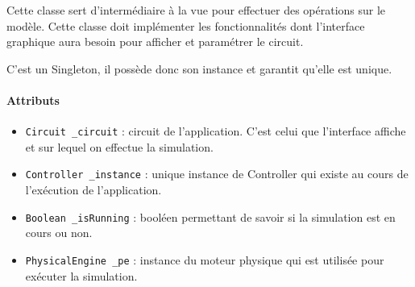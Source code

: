 \documentclass{report}
\begin{document}
Cette classe sert d'intermédiaire à la vue pour effectuer des opérations sur le modèle. Cette classe doit implémenter les fonctionnalités dont l'interface graphique aura besoin pour afficher et paramétrer le circuit.

C'est un Singleton, il possède donc son instance et garantit qu'elle est unique.

\paragraph*{Attributs}
\begin{itemize}
\item \texttt{Circuit \_circuit} : circuit de l'application. C'est celui que l'interface affiche et sur lequel on effectue la simulation.
\item \texttt{Controller \_instance} : unique instance de Controller qui existe au cours de l'exécution de l'application.
\item \texttt{Boolean \_isRunning} : booléen permettant de savoir si la simulation est en cours ou non.
\item \texttt{PhysicalEngine \_pe} : instance du moteur physique qui est utilisée pour exécuter la simulation.
\end{itemize}
\end{document}

